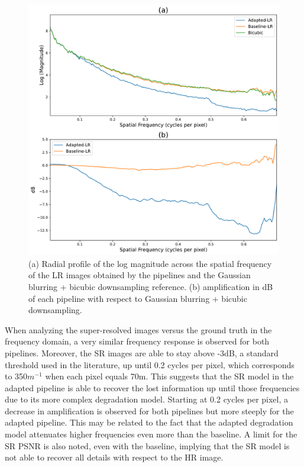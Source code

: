         \begin{figure}[H]
            \centering
            \includegraphics[scale=0.45]{Includes/5-lr-images-fft-comparison.pdf}
            \caption{(a) Radial profile of the log magnitude across the spatial frequency of the LR images obtained by the pipelines and the Gaussian blurring + bicubic downsampling reference. (b) amplification in dB of each pipeline with respect to Gaussian blurring + bicubic downsampling.}
            \label{fig:5-lr-images-fft-comparison.pdf}
        \end{figure}

        When analyzing the super-resolved images versus the ground truth in the frequency domain, a very similar frequency response is observed for both pipelines.
        Moreover, the SR images are able to stay above -3dB, a standard threshold used in the literature, up until 0.2 cycles per pixel, which corresponds to 350$m^{-1}$ when each pixel equals 70m.
        This suggests that the SR model in the adapted pipeline is able to recover the lost information up until those frequencies due to its more complex degradation model.
        Starting at 0.2 cycles per pixel, a decrease in amplification is observed for both pipelines but more steeply for the adapted pipeline.
        This may be related to the fact that the adapted degradation model attenuates higher frequencies even more than the baseline. 
        A limit for the SR PSNR is also noted, even with the baseline, implying that the SR model is not able to recover all details with respect to the HR image.

